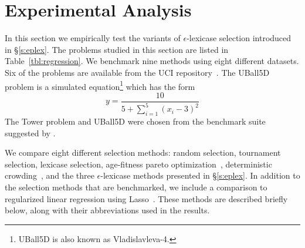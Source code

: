 \documentclass[twoside]{article}
\begin{document}
\section{Experimental Analysis} \label{s:exp}
In this section we empirically test the variants of $\epsilon$-lexicase selection introduced in \S\ref{s:eplex}. The problems studied in this section are listed in Table~\ref{tbl:regression}. We benchmark nine methods using eight different datasets. Six of the problems are available from the UCI repository~\citep{lichman_uci_2013}. The UBall5D problem is a simulated equation\footnote{UBall5D is also known as Vladislavleva-4.} which has the form \[ y = \frac{10}{5+\sum_{i=1}^5{(x_i-3)^2}}\] The Tower problem and UBall5D were chosen from the benchmark suite suggested by \cite{white_better_2012}. 

We compare eight different selection methods: random selection, tournament selection, lexicase selection, age-fitness pareto optimization~\citep{schmidt_age-fitness_2011}, deterministic crowding~\cite{mahfoud_niching_1995}, and the three $\epsilon$-lexicase methods presented in \S\ref{s:eplex}. In addition to the selection methods that are benchmarked, we include a comparison to regularized linear regression using Lasso~\citep{tibshirani_regression_1996}. These methods are described briefly below, along with their abbreviations used in the results.
\end{document}
